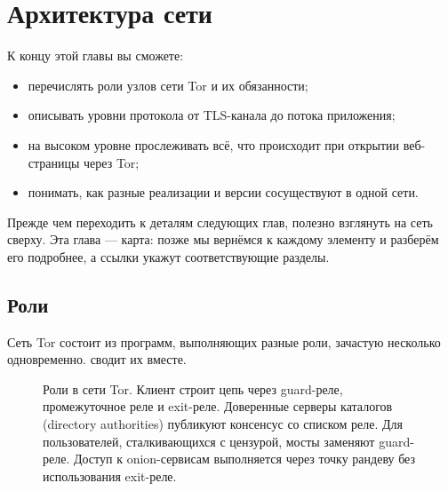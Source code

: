 \chapter{Архитектура сети}\label{cap:06-architettura}

\begin{obiettivi}
К концу этой главы вы сможете:
\begin{itemize}[nosep]
  \item перечислять роли узлов сети Tor и их обязанности;
  \item описывать уровни протокола от TLS-канала до потока приложения;
  \item на высоком уровне прослеживать всё, что происходит при открытии веб-страницы через Tor;
  \item понимать, как разные реализации и версии сосуществуют в одной сети.
\end{itemize}
\end{obiettivi}

Прежде чем переходить к деталям следующих глав, полезно взглянуть на сеть сверху. Эта глава --- карта: позже мы вернёмся к каждому элементу и разберём его подробнее, а ссылки укажут соответствующие разделы.

\section{Роли}\label{sec:arch-ruoli}

Сеть Tor состоит из программ, выполняющих разные роли, зачастую несколько одновременно.  сводит их вместе.

\begin{figure}[htbp]
\centering

\caption{Роли в сети Tor. Клиент строит цепь через guard-реле, промежуточное реле и exit-реле. Доверенные серверы каталогов (directory authorities) публикуют консенсус со списком реле. Для пользователей, сталкивающихся с цензурой, мосты заменяют guard-реле. Доступ к onion-сервисам выполняется через точку рандеву без использования exit-реле.}
\label{fig:arch-ruoli}
\end{figure}

